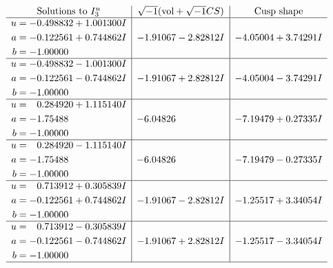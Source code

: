 \documentclass[1p]{elsarticle_modified}
\theoremstyle{definition}
\newcommand{\I}{\sqrt{-1}}
\begin{document}
$$\begin{array}{c|c|c}  
\text{Solutions to }I^u_{3}& \I (\text{vol} + \sqrt{-1}CS) & \text{Cusp shape}\\
 \hline 
\begin{aligned}
u &= -0.498832 + 1.001300 I \\
a &= -0.122561 + 0.744862 I \\
b &= -1.00000\phantom{ +0.000000I}\end{aligned}
 & -1.91067 - 2.82812 I & -4.05004 + 3.74291 I \\ \hline\begin{aligned}
u &= -0.498832 - 1.001300 I \\
a &= -0.122561 - 0.744862 I \\
b &= -1.00000\phantom{ +0.000000I}\end{aligned}
 & -1.91067 + 2.82812 I & -4.05004 - 3.74291 I \\ \hline\begin{aligned}
u &= \phantom{-}0.284920 + 1.115140 I \\
a &= -1.75488\phantom{ +0.000000I} \\
b &= -1.00000\phantom{ +0.000000I}\end{aligned}
 & -6.04826\phantom{ +0.000000I} & -7.19479 + 0.27335 I \\ \hline\begin{aligned}
u &= \phantom{-}0.284920 - 1.115140 I \\
a &= -1.75488\phantom{ +0.000000I} \\
b &= -1.00000\phantom{ +0.000000I}\end{aligned}
 & -6.04826\phantom{ +0.000000I} & -7.19479 - 0.27335 I \\ \hline\begin{aligned}
u &= \phantom{-}0.713912 + 0.305839 I \\
a &= -0.122561 + 0.744862 I \\
b &= -1.00000\phantom{ +0.000000I}\end{aligned}
 & -1.91067 - 2.82812 I & -1.25517 + 3.34054 I \\ \hline\begin{aligned}
u &= \phantom{-}0.713912 - 0.305839 I \\
a &= -0.122561 - 0.744862 I \\
b &= -1.00000\phantom{ +0.000000I}\end{aligned}
 & -1.91067 + 2.82812 I & -1.25517 - 3.34054 I\\
 \hline 
 \end{array}$$\newpage
\end{document}
